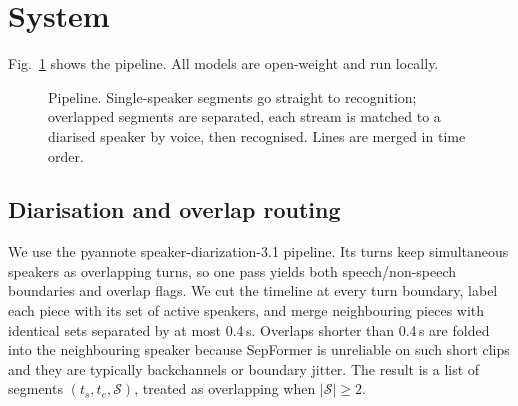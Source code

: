 \documentclass[conference]{IEEEtran}
\begin{document}
\section{System}\label{sec:system}
Fig.~\ref{fig:arch} shows the pipeline. All models are open-weight and run locally.

\begin{figure}[t]
\centering
{}
\caption{Pipeline. Single-speaker segments go straight to recognition; overlapped segments are separated, each stream is matched to a diarised speaker by voice, then recognised. Lines are merged in time order.}
\label{fig:arch}
\end{figure}

\subsection{Diarisation and overlap routing}
We use the pyannote speaker-diarization-3.1 pipeline. Its turns keep simultaneous speakers as overlapping turns, so one pass yields both speech/non-speech boundaries and overlap flags. We cut the timeline at every turn boundary, label each piece with its set of active speakers, and merge neighbouring pieces with identical sets separated by at most 0.4\,s. Overlaps shorter than 0.4\,s are folded into the neighbouring speaker because SepFormer is unreliable on such short clips and they are typically backchannels or boundary jitter. The result is a list of segments $(t_s, t_e, \mathcal{S})$, treated as overlapping when $|\mathcal{S}|\ge 2$.
\end{document}
